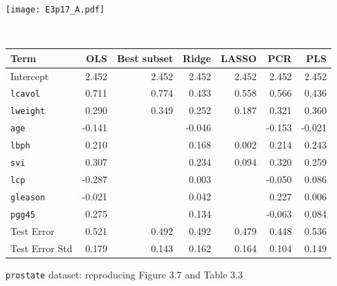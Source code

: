 \begin{figure}
\begin{minipage}{\textwidth}
    \texttt{[image: E3p17\_A.pdf]}
\end{minipage}\vspace{1cm}\\

\begin{minipage}{\textwidth}
    \centering
    \begin{tabular}{lrrrrrr}
        \toprule
        Term &     OLS & Best subset &   Ridge &  LASSO &     PCR &     PLS \\
        \midrule
        Intercept      &   2.452 &       2.452 &   2.452 &  2.452 &   2.452 &   2.452 \\
        \texttt{lcavol}         &   0.711 &       0.774 &   0.433 &  0.558 &   0.566 &   0.436 \\
        \texttt{lweight}        &   0.290 &       0.349 &   0.252 &  0.187 &   0.321 &   0.360 \\
        \texttt{age}            &  -0.141 &             &  -0.046 &        &  -0.153 &  -0.021 \\
        \texttt{lbph}           &   0.210 &             &   0.168 &  0.002 &   0.214 &   0.243 \\
        \texttt{svi}            &   0.307 &             &   0.234 &  0.094 &   0.320 &   0.259 \\
        \texttt{lcp}            &  -0.287 &             &   0.003 &        &  -0.050 &   0.086 \\
        \texttt{gleason}        &  -0.021 &             &   0.042 &        &   0.227 &   0.006 \\
        \texttt{pgg45}          &   0.275 &             &   0.134 &        &  -0.063 &   0.084 \\
        \midrule
        Test Error     &   0.521 &       0.492 &   0.492 &  0.479 &   0.448 &   0.536 \\
        Test Error Std &   0.179 &       0.143 &   0.162 &  0.164 &   0.104 &   0.149 \\
        \bottomrule
    \end{tabular}
\end{minipage}
\caption{\texttt{prostate} dataset: reproducing Figure 3.7 and Table 3.3}
\end{figure}

